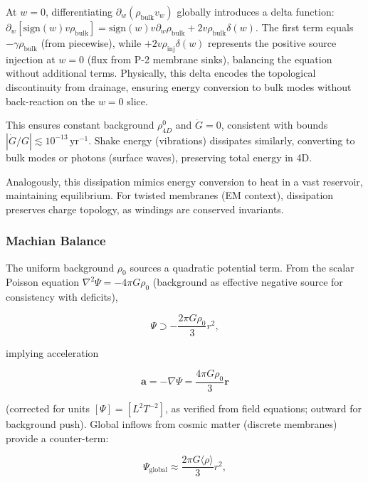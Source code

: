 At $w=0$, differentiating $\partial_w (\rho_{\text{bulk}} v_w)$ globally introduces a delta function: $\partial_w [\text{sign}(w) v \rho_{\text{bulk}}] = \text{sign}(w) v \partial_w \rho_{\text{bulk}} + 2 v \rho_{\text{bulk}} \delta(w)$. The first term equals $-\gamma \rho_{\text{bulk}}$ (from piecewise), while $+2 v \rho_{\text{inj}} \delta(w)$ represents the positive source injection at $w=0$ (flux from P-2 membrane sinks), balancing the equation without additional terms. Physically, this delta encodes the topological discontinuity from drainage, ensuring energy conversion to bulk modes without back-reaction on the $w=0$ slice.

This ensures constant background $\rho_{4D}^0$ and $\dot{G} = 0$, consistent with bounds $|\dot{G}/G| \lesssim 10^{-13} \, \mathrm{yr}^{-1}$. Shake energy (vibrations) dissipates similarly, converting to bulk modes or photons (surface waves), preserving total energy in 4D.

Analogously, this dissipation mimics energy conversion to heat in a vast reservoir, maintaining equilibrium. For twisted membranes (EM context), dissipation preserves charge topology, as windings are conserved invariants.

\subsubsection{Machian Balance}
The uniform background $\rho_0$ sources a quadratic potential term. From the scalar Poisson equation $\nabla^2 \Psi = -4\pi G \rho_0$ (background as effective negative source for consistency with deficits),

\begin{equation}
\Psi \supset -\frac{2\pi G \rho_0}{3} r^2,
\end{equation}

implying acceleration

\begin{equation}
\mathbf{a} = -\nabla \Psi = \frac{4\pi G \rho_0}{3} \mathbf{r}
\end{equation}

(corrected for units $[\Psi] = [L^2 T^{-2}]$, as verified from field equations; outward for background push). Global inflows from cosmic matter (discrete membranes) provide a counter-term:

\begin{equation}
\Psi_{\text{global}} \approx \frac{2\pi G \langle \rho \rangle}{3} r^2,
\end{equation}

